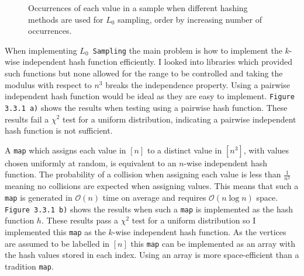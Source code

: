 \documentclass[11pt,twoside,a4paper]{report}
\begin{document}
\begin{figure}[H]
	\label{Figure 13}
	\caption{Occurrences of each value in a sample when different hashing methods are used for $L_0$ sampling, order by increasing number of occurrences.}
\end{figure}
When implementing \texttt{$L_0$ Sampling} the main problem is how to implement the $k$-wise independent hash function efficiently. I looked into libraries which provided such functions but none allowed for the range to be controlled and taking the modulus with respect to $n^3$ breaks the independence property. Using a pairwise independent hash function would be ideal as they are easy to implement. \texttt{Figure 3.3.1 a)} shows the results when testing using a pairwise hash function. These results fail a $\chi^2$ test for a uniform distribution, indicating a pairwise independent hash function is not sufficient.

\par A \texttt{map} which assigns each value in $[n]$ to a distinct value in $[n^3]$, with values chosen uniformly at random, is equivalent to an $n$-wise independent hash function. The probability of a collision when assigning each value is less than $\frac1{n^2}$ meaning no collisions are expected when assigning values. This means that such a \texttt{map} is generated in $\mathcal{O}(n)$ time on average and requires $\mathcal{O}(n\log n)$ space. \texttt{Figure 3.3.1 b)} shows the results when such a \texttt{map} is implemented as the hash function $h$. These results pass a $\chi^2$ test for a uniform distribution so I implemented this \texttt{map} as the $k$-wise independent hash function. As the vertices are assumed to be labelled in $[n]$ this \texttt{map} can be implemented as an array with the hash values stored in each index. Using an array is more space-efficient than a tradition \texttt{map}.
\end{document}
